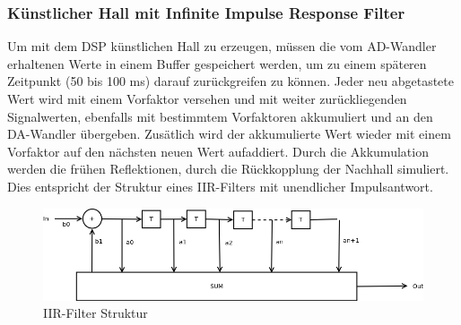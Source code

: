 \documentclass[a4paper,12pt,fontsize=12,DIV=12]{scrartcl}
\begin{document}
\subsubsection{Künstlicher Hall mit Infinite Impulse Response Filter}
Um mit dem DSP künstlichen Hall zu erzeugen, müssen die vom AD-Wandler erhaltenen Werte in einem Buffer gespeichert werden, um zu einem späteren Zeitpunkt (50 bis 100 ms) darauf zurückgreifen zu können. Jeder neu abgetastete Wert wird mit einem Vorfaktor versehen und mit weiter zurückliegenden Signalwerten, ebenfalls mit bestimmtem Vorfaktoren akkumuliert und an den DA-Wandler übergeben. Zusätlich wird der akkumulierte Wert wieder mit einem Vorfaktor auf den nächsten neuen Wert aufaddiert. Durch die Akkumulation werden die frühen Reflektionen, durch die Rückkopplung der Nachhall simuliert. 
Dies entspricht der Struktur eines IIR-Filters mit unendlicher Impulsantwort.
\begin{figure}[h]
	\includegraphics[scale=0.5]{Bilder/iir.png}
	\caption{IIR-Filter Struktur}
	\label{labelname}
\end{figure}
\end{document}
